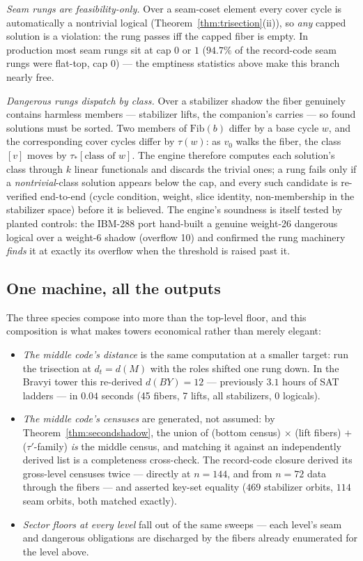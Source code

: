 \documentclass[11pt]{article}
\theoremstyle{plain}
\theoremstyle{definition}
\theoremstyle{remark}
\begin{document}
\emph{Seam rungs are feasibility-only.} Over a seam-coset element every
cover cycle is automatically a nontrivial logical
(Theorem~\ref{thm:trisection}(ii)), so \emph{any} capped solution is a
violation: the rung passes iff the capped fiber is empty. In production
most seam rungs sit at cap $0$ or $1$ ($94.7\%$ of the record-code seam
rungs were flat-top, cap $0$) --- the emptiness statistics above make
this branch nearly free.

\emph{Dangerous rungs dispatch by class.} Over a stabilizer shadow the
fiber genuinely contains harmless members --- stabilizer lifts, the
companion's carries --- so found solutions must be sorted. Two members of
$\mathrm{Fib}(b)$ differ by a base cycle $w$, and the corresponding cover
cycles differ by $\tau(w)$: as $v_0$ walks the fiber, the class $[v]$
moves by $\tau_*[\text{class of } w]$. The engine therefore computes each
solution's class through $k$ linear functionals and discards the trivial
ones; a rung fails only if a \emph{nontrivial}-class solution appears
below the cap, and every such candidate is re-verified end-to-end (cycle
condition, weight, slice identity, non-membership in the stabilizer
space) before it is believed. The engine's soundness is itself tested by
planted controls: the IBM-288 port hand-built a genuine weight-26
dangerous logical over a weight-6 shadow (overflow 10) and confirmed the
rung machinery \emph{finds} it at exactly its overflow when the threshold
is raised past it.

\subsection{One machine, all the outputs}
\label{sec:onemachine}

The three species compose into more than the top-level floor, and this
composition is what makes towers economical rather than merely elegant:

\begin{itemize}[leftmargin=2em]
\item \emph{The middle code's distance} is the same computation at a
  smaller target: run the trisection at $d_t = d(M)$ with the roles
  shifted one rung down. In the Bravyi tower this re-derived $d(BY) =
  12$ --- previously $3.1$ hours of SAT ladders --- in $0.04$ seconds
  (45 fibers, 7 lifts, all stabilizers, 0 logicals).
\item \emph{The middle code's censuses} are generated, not assumed: by
  Theorem~\ref{thm:secondshadow}, the union of (bottom census) $\times$
  (lift fibers) $+$ ($\tau'$-family) \emph{is} the middle census, and
  matching it against an independently derived list is a completeness
  cross-check. The record-code closure derived its gross-level censuses
  twice --- directly at $n = 144$, and from $n = 72$ data through the
  fibers --- and asserted key-set equality ($469$ stabilizer orbits,
  $114$ seam orbits, both matched exactly).
\item \emph{Sector floors at every level} fall out of the same sweeps ---
  each level's seam and dangerous obligations are discharged by the
  fibers already enumerated for the level above.
\end{itemize}
\end{document}
